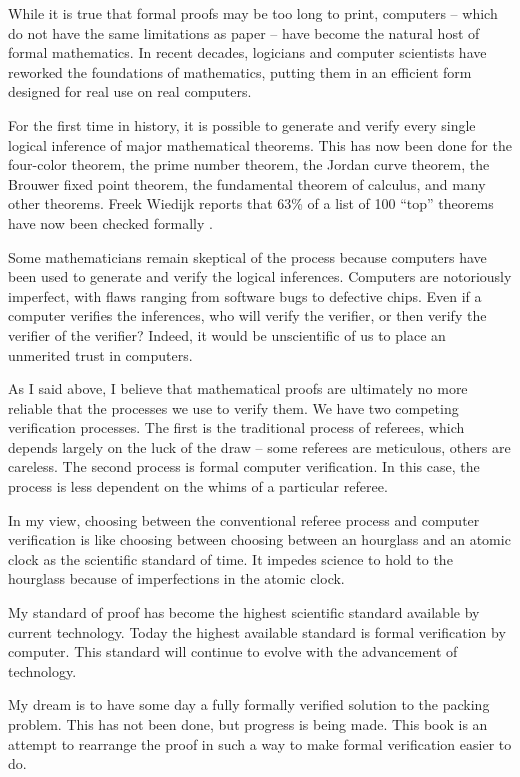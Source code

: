 While it is true that formal proofs may be too long to print,
computers -- which do not have the same limitations as paper -- have
become the natural host of formal mathematics. In recent decades,
logicians and computer scientists have reworked the foundations of
mathematics, putting them in an efficient form designed for real use
on real computers.

For the first time in history, it is possible to generate and verify
every single logical inference of major mathematical theorems.  This
has now been done for the four-color theorem, the prime number
theorem, the Jordan curve theorem, the Brouwer fixed point theorem,
the fundamental theorem of calculus, and many other theorems.  Freek
Wiedijk reports that 63\% of a list of 100 ``top'' theorems have now
been checked formally \cite{freek}.

Some mathematicians remain skeptical of the process because
computers have been used to generate and verify the logical
inferences.  Computers are notoriously imperfect, with flaws ranging
from software bugs to defective chips.  Even if a computer verifies
the inferences, who will verify the verifier, or then verify the
verifier of the verifier?  Indeed, it would be unscientific of us to
place an unmerited trust in computers.

As I said above, I believe that mathematical proofs are ultimately
no more reliable that the processes we use to verify them.  We have
two competing verification processes.  The first is the traditional
process of referees, which depends largely on the luck of the draw
-- some referees are meticulous, others are careless.   The second
process is formal computer verification. In this case, the process
is less dependent on the whims of a particular referee.

In my view, choosing between the conventional referee process and
computer verification is like choosing between choosing between an
hourglass and an atomic clock as the scientific standard of time. It
impedes science to hold to the hourglass because of imperfections in
the atomic clock.

My standard of proof has become the highest scientific standard
available by current technology.  Today the highest available
standard is formal verification by computer.  This standard will
continue to evolve with the advancement of technology.

My dream is to have some day a fully formally verified solution to
the packing problem.
This has not been done, but progress is being
made.  This book is an attempt to rearrange the proof
in such a way to make formal verification easier to do.


